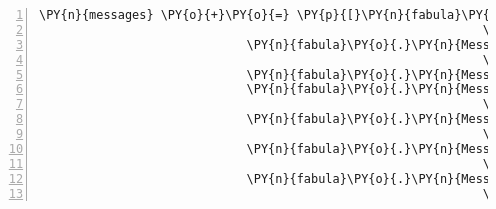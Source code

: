 \begin{Verbatim}[commandchars=\\\{\},numbers=left,firstnumber=1,stepnumber=1]
                \PY{n}{messages} \PY{o}{+}\PY{o}{=} \PY{p}{[}\PY{n}{fabula}\PY{o}{.}\PY{n}{Message}\PY{p}{(}\PY{p}{[}\PY{n}{fabula}\PY{o}{.}\PY{n}{SaysEvent}\PY{p}{(}\PY{n}{identifier}\PY{o}{=}\PY{l+s}{\PYZsq{}}\PY{l+s}{guardian}\PY{l+s}{\PYZsq{}}\PY{p}{,}
                                                              \PY{n}{text}\PY{o}{=}\PY{l+s}{\PYZsq{}}\PY{l+s}{Ach das ist ja nett! Ich teile den Kuchen.}\PY{l+s}{\PYZsq{}}\PY{p}{)}\PY{p}{]}\PY{p}{)}\PY{p}{,}
                             \PY{n}{fabula}\PY{o}{.}\PY{n}{Message}\PY{p}{(}\PY{p}{[}\PY{n}{fabula}\PY{o}{.}\PY{n}{SaysEvent}\PY{p}{(}\PY{n}{identifier}\PY{o}{=}\PY{l+s}{\PYZsq{}}\PY{l+s}{guardian}\PY{l+s}{\PYZsq{}}\PY{p}{,}
                                                              \PY{n}{text}\PY{o}{=}\PY{l+s}{\PYZsq{}}\PY{l+s}{Mampf, mampf...}\PY{l+s}{\PYZsq{}}\PY{p}{)}\PY{p}{]}\PY{p}{)}\PY{p}{,}
                             \PY{n}{fabula}\PY{o}{.}\PY{n}{Message}\PY{p}{(}\PY{p}{[}\PY{n}{fabula}\PY{o}{.}\PY{n}{DeleteEvent}\PY{p}{(}\PY{n}{identifier}\PY{o}{=}\PY{l+s}{\PYZsq{}}\PY{l+s}{cake}\PY{l+s}{\PYZsq{}}\PY{p}{)}\PY{p}{]}\PY{p}{)}\PY{p}{,}
                             \PY{n}{fabula}\PY{o}{.}\PY{n}{Message}\PY{p}{(}\PY{p}{[}\PY{n}{fabula}\PY{o}{.}\PY{n}{SaysEvent}\PY{p}{(}\PY{n}{identifier}\PY{o}{=}\PY{l+s}{\PYZsq{}}\PY{l+s}{guardian}\PY{l+s}{\PYZsq{}}\PY{p}{,}
                                                              \PY{n}{text}\PY{o}{=}\PY{l+s}{\PYZsq{}}\PY{l+s}{Wisst ihr, ich war ja nicht immer Wächter des Waldweges.}\PY{l+s}{\PYZsq{}}\PY{p}{)}\PY{p}{]}\PY{p}{)}\PY{p}{,}
                             \PY{n}{fabula}\PY{o}{.}\PY{n}{Message}\PY{p}{(}\PY{p}{[}\PY{n}{fabula}\PY{o}{.}\PY{n}{SaysEvent}\PY{p}{(}\PY{n}{identifier}\PY{o}{=}\PY{l+s}{\PYZsq{}}\PY{l+s}{guardian}\PY{l+s}{\PYZsq{}}\PY{p}{,}
                                                              \PY{n}{text}\PY{o}{=}\PY{l+s}{\PYZsq{}}\PY{l+s}{Ich war leidenschaftlicher Minnesänger.}\PY{l+s}{\PYZsq{}}\PY{p}{)}\PY{p}{]}\PY{p}{)}\PY{p}{,}
                             \PY{n}{fabula}\PY{o}{.}\PY{n}{Message}\PY{p}{(}\PY{p}{[}\PY{n}{fabula}\PY{o}{.}\PY{n}{SaysEvent}\PY{p}{(}\PY{n}{identifier}\PY{o}{=}\PY{n}{ID\PYZus{}CASSANDRA}\PY{p}{,}
                                                              \PY{n}{text}\PY{o}{=}\PY{l+s}{\PYZsq{}}\PY{l+s}{Oh wirklich?}\PY{l+s}{\PYZsq{}}\PY{p}{)}\PY{p}{]}\PY{p}{)}\PY{p}{,}
                             \PY{n}{fabula}\PY{o}{.}\PY{n}{Message}\PY{p}{(}\PY{p}{[}\PY{n}{fabula}\PY{o}{.}\PY{n}{SaysEvent}\PY{p}{(}\PY{n}{identifier}\PY{o}{=}\PY{l+s}{\PYZsq{}}\PY{l+s}{guardian}\PY{l+s}{\PYZsq{}}\PY{p}{,}
                                                              \PY{n}{text}\PY{o}{=}\PY{l+s}{\PYZsq{}}\PY{l+s}{Ja! Und dann haben mich Räuber überfallen, mir alles Gold }\PY{l+s}{\PYZsq{}}

\end{Verbatim}
